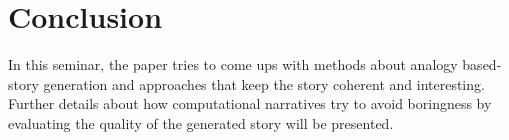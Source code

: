 \documentclass[english]{tktltiki}
\begin{document}
\section{Conclusion}
In this seminar, the paper tries to come ups with methods about analogy based-story generation and approaches that keep the story coherent and interesting. Further details about how computational narratives try to avoid boringness by evaluating the quality of the generated story will be presented. 








\lastpage

\appendices

\pagestyle{empty}
\end{document}
